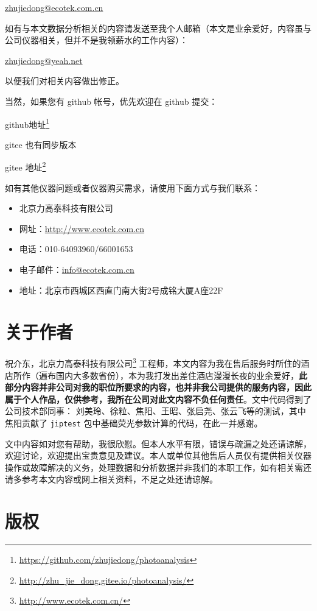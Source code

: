 \documentclass[
]{krantz}
\renewcommand{\href}[2]{#2\footnote{\url{#1}}}
\begin{document}
\url{zhujiedong@ecotek.com.cn}

如有与本文数据分析相关的内容请发送至我个人邮箱（本文是业余爱好，内容虽与公司仪器相关，但并不是我领薪水的工作内容）：

\url{zhujiedong@yeah.net}

以便我们对相关内容做出修正。

当然，如果您有 github 帐号，优先欢迎在 github 提交：

\href{https://github.com/zhujiedong/photoanalysis}{github地址}

gitee 也有同步版本

\href{http://zhu_jie_dong.gitee.io/photoanalysis/}{gitee 地址}

如有其他仪器问题或者仪器购买需求，请使用下面方式与我们联系：

\begin{itemize}
\item
  北京力高泰科技有限公司
\item
  网址：\url{http://www.ecotek.com.cn}
\item
  电话：010-64093960/66001653
\item
  电子邮件：\url{info@ecotek.com.cn}
\item
  地址：北京市西城区西直门南大街2号成铭大厦A座22F
\end{itemize}

\hypertarget{author}{%
\chapter*{关于作者}\label{author}}


祝介东，\href{http://www.ecotek.com.cn/}{北京力高泰科技有限公司} 工程师，本文内容为我在售后服务时所住的酒店所作（遍布国内大多数省份），本为我打发出差住酒店漫漫长夜的业余爱好，\textbf{此部分内容并非公司对我的职位所要求的内容，也并非我公司提供的服务内容，因此属于个人作品，仅供参考，我所在公司对此文内容不负任何责任}。文中代码得到了公司技术部同事： 刘美玲、徐粒、焦阳、王昭、张启尧、张云飞等的测试，其中焦阳贡献了 \texttt{jiptest} 包中基础荧光参数计算的代码，在此一并感谢。

文中内容如对您有帮助，我很欣慰。但本人水平有限，错误与疏漏之处还请谅解，欢迎讨论，欢迎提出宝贵意见及建议。本人或单位其他售后人员仅有提供相关仪器操作或故障解决的义务，处理数据和分析数据并非我们的本职工作，如有相关需还请多参考本文内容或网上相关资料，不足之处还请谅解。

\hypertarget{copyright}{%
\chapter*{版权}\label{copyright}}
\end{document}
